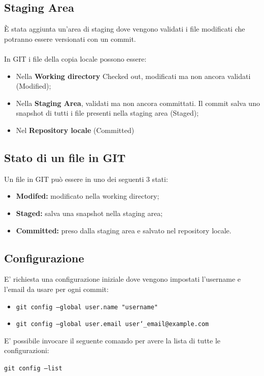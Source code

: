 \documentclass[12pt, a4paper]{article}
\begin{document}
\subsection{Staging Area}
È stata aggiunta un’area di staging dove vengono validati i file modificati che potranno essere versionati con un commit.\\\\
In GIT i file della copia locale possono essere:
\begin{itemize}
    \item Nella \textbf{Working directory} Checked out, modificati ma non ancora validati (Modified);
    \item Nella \textbf{Staging Area}, validati ma non ancora committati. Il commit salva uno snapshot di tutti i file presenti nella staging area (Staged);
    \item Nel \textbf{Repository locale} (Committed)
\end{itemize}

\subsection{Stato di un file in GIT}
Un file in GIT può essere in uno dei seguenti 3 stati:
\begin{itemize}
    \item \textbf{Modifed:} modificato nella working directory;
    \item \textbf{Staged:} salva una snapshot nella staging area;
    \item \textbf{Committed:} preso dalla staging area e salvato nel repository locale.
\end{itemize}

\subsection{Configurazione}
E’ richiesta una configurazione iniziale dove vengono impostati l’username e l’email da usare per ogni commit:
\begin{center}
    \begin{itemize}
        \item \texttt{git config --global user.name "username"}
        \item \texttt{git config --global user.email user\char`_email@example.com}
    \end{itemize}
\end{center}
E’ possibile invocare il seguente comando per avere la lista di tutte le configurazioni:
\begin{center}
    \texttt{git config --list}
\end{center}
\end{document}

